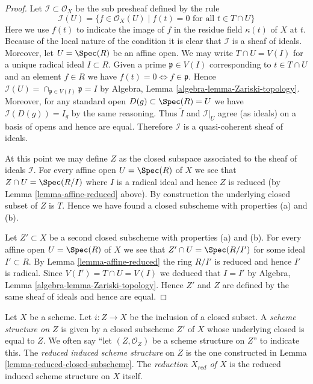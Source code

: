 \begin{proof}
Let $\mathcal{I} \subset \mathcal{O}_X$ be the sub presheaf
defined by the rule
$$
\mathcal{I}(U) = \{f \in \mathcal{O}_X(U) \mid
f(t) = 0\text{ for all }t \in T\cap U\}
$$
Here we use $f(t)$ to indicate the image of
$f$ in the residue field $\kappa(t)$ of $X$ at $t$.
Because of the local nature of the condition it is
clear that $\mathcal{I}$ is a sheaf of ideals. Moreover,
let $U = \Spec(R)$ be an affine open.
We may write $T \cap U = V(I)$ for a unique radical
ideal $I \subset R$. Given a prime $\mathfrak p \in V(I)$
corresponding to $t \in T \cap U$ and an element $f \in R$ we have
$f(t) = 0 \Leftrightarrow f \in \mathfrak p$.
Hence $\mathcal{I}(U) = \cap_{\mathfrak p \in V(I)} \mathfrak p
= I$ by Algebra, Lemma \ref{algebra-lemma-Zariski-topology}.
Moreover, for any standard open $D(g) \subset \Spec(R) = U$
we have $\mathcal{I}(D(g)) = I_g$ by the same reasoning.
Thus $\widetilde I$ and $\mathcal{I}|_U$ agree (as ideals)
on a basis of opens and hence are equal. Therefore
$\mathcal{I}$ is a quasi-coherent sheaf of ideals.

\medskip\noindent
At this point we may define $Z$ as the closed subspace
associated to the sheaf of ideals $\mathcal{I}$. For every
affine open $U = \Spec(R)$ of $X$ we see that
$Z \cap U = \Spec(R/I)$ where $I$ is a radical ideal and
hence $Z$ is reduced (by Lemma \ref{lemma-affine-reduced} above).
By construction the underlying closed subset of $Z$ is $T$.
Hence we have found a closed subscheme with properties (a) and (b).

\medskip\noindent
Let $Z' \subset X$ be a second closed subscheme with properties (a) and (b).
For every affine open $U = \Spec(R)$ of $X$ we see that
$Z' \cap U = \Spec(R/I')$ for some ideal $I' \subset R$.
By Lemma \ref{lemma-affine-reduced} the ring $R/I'$ is
reduced and hence $I'$ is radical. Since $V(I') = T \cap U = V(I)$
we deduced that $I = I'$ by
Algebra, Lemma \ref{algebra-lemma-Zariski-topology}.
Hence $Z'$ and $Z$ are defined by the same sheaf of ideals
and hence are equal.
\end{proof}

\begin{definition}
\label{definition-reduced-induced-scheme}
Let $X$ be a scheme. Let $i : Z \to X$ be the inclusion of a closed subset.
A {\it scheme structure on $Z$} is given by a closed subscheme $Z'$ of
$X$ whose underlying closed is equal to $Z$. We often say
``let $(Z, \mathcal{O}_Z)$ be a scheme structure on $Z$'' to
indicate this. The {\it reduced induced scheme structure}
on $Z$ is the one constructed in Lemma \ref{lemma-reduced-closed-subscheme}.
The {\it reduction $X_{red}$ of $X$} is the reduced induced scheme
structure on $X$ itself.
\end{definition}

